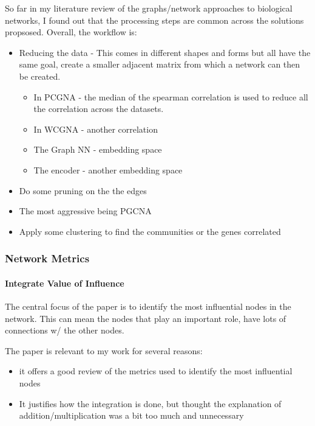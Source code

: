 So far in my literature review of the graphs/network approaches to biological networks, I found out that the processing steps are common across the solutions propsosed. Overall, the workflow is:
\begin{itemize}
    \item Reducing the data - This comes in different shapes and forms but all have the same goal, create a smaller adjacent matrix from which a network can then be created.
    \begin{itemize}
        \item In PCGNA - the median of the spearman correlation is used to reduce all the correlation across the datasets.
        \item In WCGNA - another correlation
        \item The Graph NN - embedding space
        \item The encoder - another embedding space
    \end{itemize}
    \item Do some pruning on the the edges
    \item The most aggressive being PGCNA 
    \item Apply some clustering to find the communities or the genes correlated 
\end{itemize}



\subsubsection{Network Metrics}

\paragraph{Integrate Value of Influence}

The central focus of the paper is to identify the most influential nodes in the network. This can mean the nodes that play an important role, have lots of connections w/ the other nodes. 

The paper is relevant to my work for several reasons:
\begin{itemize}
    \item it offers a good review of the metrics used to identify the most influential nodes
    \item  It justifies how the integration is done, but thought the explanation of addition/multiplication was a bit too much and unnecessary
\end{itemize}

